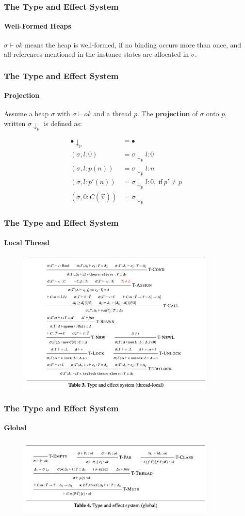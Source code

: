 \begin{frame}
    
\frametitle{The Type and Effect System}
\framesubtitle{Well-Formed Heaps}

$\sigma \vdash ok$ means the heap is well-formed, if no binding occurs more than once, and all references mentioned in the instance states are allocated in $\sigma$.

\end{frame}





\begin{frame}
\frametitle{The Type and Effect System}
\framesubtitle{Projection}

\begin{definition}
Assume a heap $\sigma$ with $\sigma \vdash ok$ and a thread $p$. The \textbf{projection} of $\sigma$ onto $p$, written $\sigma \downarrow_p$ is defined as:
\end{definition}
\begin{align*}
\bullet \downarrow_p & = \bullet \\
(\sigma, l:0) & = \sigma \downarrow_p l:0 \\
(\sigma, l:p(n))  & = \sigma \downarrow_p l:n \\
(\sigma, l:p'(n))  & = \sigma \downarrow_p l:0,  ~\text{if}~ p'\not = p \\
(\sigma, 0:C(\vec{v}))  & = \sigma \downarrow_p 
\end{align*}  
\end{frame}



\begin{frame}
\frametitle{The Type and Effect System}
\framesubtitle{Local Thread}
\begin{figure}[h]
    \includegraphics[width=10cm]{figures/local_system.png}
    \label{fig::local::system}
\end{figure}
\end{frame}



\begin{frame}
\frametitle{The Type and Effect System}
\framesubtitle{Global}
\begin{figure}[h]
    \includegraphics[width=10cm]{figures/global_system.png}
    \label{fig::global::system}
\end{figure}
\end{frame}

